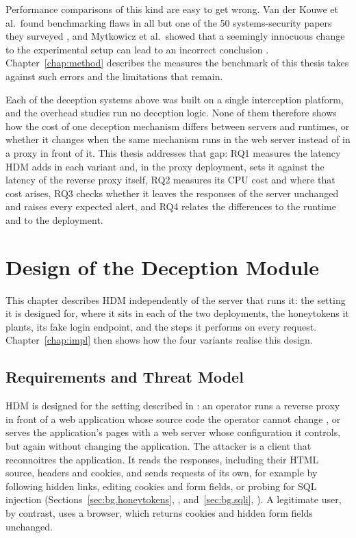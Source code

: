 \documentclass{rptuma}
\begin{document}
Performance comparisons of this kind are easy to get wrong. Van der Kouwe et al.\ found
benchmarking flaws in all but one of the 50 systems-security papers they surveyed
\cite{vanderkouwe2019sok}, and Mytkowicz et al.\ showed that a seemingly innocuous change to the
experimental setup can lead to an incorrect conclusion \cite{mytkowicz2009wrong}. Chapter~\ref{chap:method}
describes the measures the benchmark of this thesis takes against such errors and the limitations
that remain.

Each of the deception systems above was built on a single interception platform, and the overhead
studies run no deception logic. None of them therefore shows how the cost of one deception
mechanism differs between servers and runtimes, or whether it changes when the same mechanism runs
in the web server instead of in a proxy in front of it. This thesis addresses that gap: RQ1
measures the latency HDM adds in each variant and, in the proxy deployment, sets it against the
latency of the reverse proxy itself, RQ2 measures its CPU cost and where that cost arises, RQ3 checks whether it leaves the
responses of the server unchanged and raises every expected alert, and RQ4 relates the
differences to the runtime and to the deployment.

\chapter{Design of the Deception Module}
\label{chap:design}

This chapter describes HDM independently of the server that runs it: the setting it is designed for, where
it sits in each of the two deployments, the honeytokens it plants, its fake login endpoint, and the
steps it performs on every request. Chapter~\ref{chap:impl} then shows how the four variants realise
this design.

\section{Requirements and Threat Model}
\label{sec:design.req}

HDM is designed for the setting described in : an operator runs
a reverse proxy in front of a web application whose source code the operator cannot change
\cite{kahlhofer2024application}, or serves the application's pages with a web server whose
configuration it controls, but again without changing the application. The attacker is a client that reconnoitres the application. It
reads the responses, including their HTML source, headers and cookies, and sends requests of its
own, for example by following hidden links, editing cookies and form fields, or probing for SQL
injection (Sections~\ref{sec:bg.honeytokens}, \emph{}, and~\ref{sec:bg.sqli}, \emph{}). A legitimate user, by
contrast, uses a browser, which returns cookies and hidden form fields unchanged.
\end{document}
